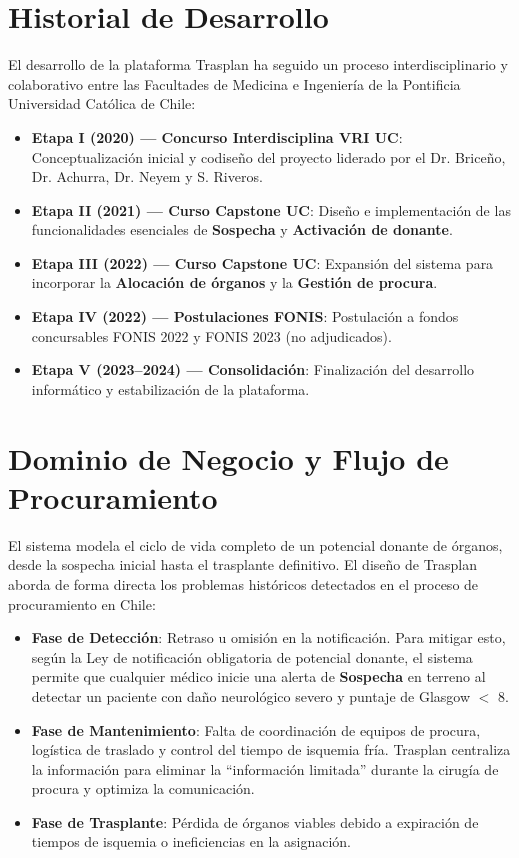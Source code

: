\documentclass[11pt, a4paper]{article}
\begin{document}
\section{Historial de Desarrollo}
El desarrollo de la plataforma Trasplan ha seguido un proceso interdisciplinario y colaborativo entre las Facultades de Medicina e Ingeniería de la Pontificia Universidad Católica de Chile:
\begin{itemize}
    \item \textbf{Etapa I (2020) --- Concurso Interdisciplina VRI UC}: Conceptualización inicial y codiseño del proyecto liderado por el Dr. Briceño, Dr. Achurra, Dr. Neyem y S. Riveros.
    \item \textbf{Etapa II (2021) --- Curso Capstone UC}: Diseño e implementación de las funcionalidades esenciales de \textbf{Sospecha} y \textbf{Activación de donante}.
    \item \textbf{Etapa III (2022) --- Curso Capstone UC}: Expansión del sistema para incorporar la \textbf{Alocación de órganos} y la \textbf{Gestión de procura}.
    \item \textbf{Etapa IV (2022) --- Postulaciones FONIS}: Postulación a fondos concursables FONIS 2022 y FONIS 2023 (no adjudicados).
    \item \textbf{Etapa V (2023--2024) --- Consolidación}: Finalización del desarrollo informático y estabilización de la plataforma.
\end{itemize}

\newpage

\section{Dominio de Negocio y Flujo de Procuramiento}
El sistema modela el ciclo de vida completo de un potencial donante de órganos, desde la sospecha inicial hasta el trasplante definitivo. El diseño de Trasplan aborda de forma directa los problemas históricos detectados en el proceso de procuramiento en Chile:
\begin{itemize}
    \item \textbf{Fase de Detección}: Retraso u omisión en la notificación. Para mitigar esto, según la Ley de notificación obligatoria de potencial donante, el sistema permite que cualquier médico inicie una alerta de \textbf{Sospecha} en terreno al detectar un paciente con daño neurológico severo y puntaje de Glasgow $<$ 8.
    \item \textbf{Fase de Mantenimiento}: Falta de coordinación de equipos de procura, logística de traslado y control del tiempo de isquemia fría. Trasplan centraliza la información para eliminar la ``información limitada'' durante la cirugía de procura y optimiza la comunicación.
    \item \textbf{Fase de Trasplante}: Pérdida de órganos viables debido a expiración de tiempos de isquemia o ineficiencias en la asignación.
\end{itemize}
\end{document}
